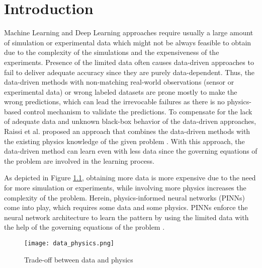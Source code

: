 \chapter{Introduction}
\label{sec:intro}

Machine Learning and Deep Learning approaches require usually a large amount of simulation
or experimental data which might not be always feasible to obtain due to the complexity
of the simulations and the expensiveness of the experiments. Presence of the limited data often
causes data-driven approaches to fail to deliver adequate accuracy since they are purely
data-dependent. Thus, the data-driven methods with non-matching
real-world observations (sensor or experimental data) or wrong labeled datasets are
prone mostly to make the wrong predictions, which can lead the irrevocable failures 
as there is no physics-based control mechanism to validate the predictions. To compensate
for the lack of adequate data and unknown black-box behavior of the data-driven approaches,
Raissi et al. proposed an approach that combines the data-driven methods
with the existing physics knowledge of the given problem \cite{raissi2019physics}. With this approach,
the data-driven method can learn even with less data since the governing equations of the 
problem are involved in the learning process.    

\hspace{1cm}

As depicted in Figure \ref{fig:data_physics}, obtaining more data is more expensive 
due to the need for more simulation or experiments, while involving more physics increases 
the complexity of the problem. Herein, physics-informed neural networks (PINNs) come 
into play, which requires some data and some physics. PINNs enforce the neural network architecture
to learn the pattern by using the limited data with the help of the governing equations of 
the problem \cite{kollmannsbergerdeep}. 

\hspace{1cm}

\begin{figure}[thbp]
    \centering
    \texttt{[image: data\_physics.png]}  
    \caption{Trade-off between data and physics}
    \label{fig:data_physics}
\end{figure}

